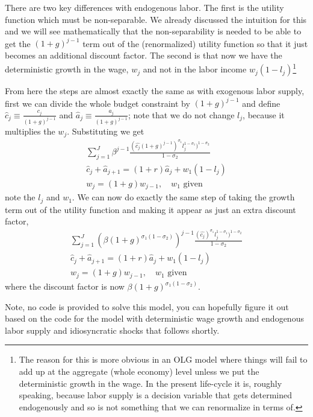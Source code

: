There are two key differences with endogenous labor. The first is the utility function which must be non-separable. We already discussed the intuition for this and we will see mathematically that the non-separability is needed to be able to get the $(1+g)^{j-1}$ term out of the (renormalized) utility function so that it just becomes an additional discount factor. The second is that now we have the deterministic growth in the wage, $w_j$ and not in the labor income $w_j(1-l_j)$\footnote{The reason for this is more obvious in an OLG model where things will fail to add up at the aggregate (whole economy) level unless we put the deterministic growth in the wage. In the present life-cycle it is, roughly speaking, because labor supply is a decision variable that gets determined endogenously and so is not something that we can renormalize in terms of.}

From here the steps are almost exactly the same as with exogenous labor supply, first we can divide the whole budget constraint by $(1+g)^{j-1}$ and define $\hat{c}_j \equiv \frac{c_j}{(1+g)^{j-1}}$ and $\hat{a}_j \equiv \frac{a_j}{(1+g)^{j-1}}$; note that we do not change $l_j$, because it multiplies the $w_j$. Substituting we get
\begin{eqnarray*}
    \sum_{j=1}^J \beta^{j-1} \frac{(\hat{c_j} (1+g)^{j-1})^{\sigma_1} l_j^{1-\sigma_1})^{1-\sigma_2}}{1-\sigma_2} \\
    \hat{c}_j+\hat{a}_{j+1}=(1+r)\hat{a}_j + w_1 (1-l_j) \\
    w_j=(1+g)w_{j-1}, \quad w_1\text{ given}
\end{eqnarray*}
note the $l_j$ and $w_1$. We can now do exactly the same step of taking the growth term out of the utility function and making it appear as just an extra discount factor,
\begin{eqnarray*}
    \sum_{j=1}^J (\beta (1+g)^{\sigma_1(1-\sigma_2)})^{j-1} \frac{(\hat{c_j})^{\sigma_1} l_j^{1-\sigma_1})^{1-\sigma_2}}{1-\sigma_2} \\
    \hat{c}_j+\hat{a}_{j+1}=(1+r)\hat{a}_j + w_1 (1-l_j) \\
    w_j=(1+g)w_{j-1}, \quad w_1\text{ given}
\end{eqnarray*}
where the discount factor is now $\beta (1+g)^{\sigma_1(1-\sigma_2)}$.

Note, no code is provided to solve this model, you can hopefully figure it out based on the code for the model with deterministic wage growth and endogenous labor supply and idiosyncratic shocks that follows shortly.

